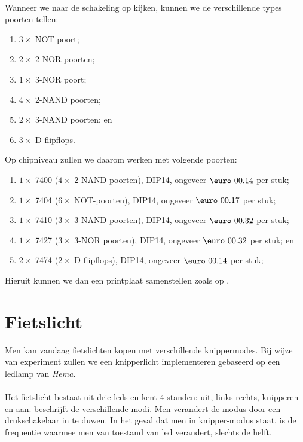 \paragraph{}
Wanneer we naar de schakeling op  kijken, kunnen we de verschillende types poorten tellen:
\begin{enumerate}
 \item $3\times$ NOT poort;%
 \item $2\times$ 2-NOR poorten;
 \item $1\times$ 3-NOR poort;
 \item $4\times$ 2-NAND poorten;%
 \item $2\times$ 3-NAND poorten; en%
 \item $3\times$ D-flipflops.%
\end{enumerate}
Op chipniveau zullen we daarom werken met volgende poorten:
\begin{enumerate}
 \item $1\times$ 7400 ($4\times$ 2-NAND poorten), DIP14, ongeveer $\mbox{\euro}\ 00.14$ per stuk;
 \item $1\times$ 7404 ($6\times$ NOT-poorten), DIP14, ongeveer $\mbox{\euro}\ 00.17$ per stuk;
 \item $1\times$ 7410 ($3\times$ 3-NAND poorten), DIP14, ongeveer $\mbox{\euro}\ 00.32$ per stuk;
 \item $1\times$ 7427 ($3\times$ 3-NOR poorten), DIP14, ongeveer $\mbox{\euro}\ 00.32$ per stuk; en
 \item $2\times$ 7474 ($2\times$ D-flipflops), DIP14, ongeveer $\mbox{\euro}\ 00.14$ per stuk;
\end{enumerate}
Hieruit kunnen we dan een printplaat samenstellen zoals op .
\section{Fietslicht}
Men kan vandaag fietslichten kopen met verschillende knippermodes. Bij wijze van experiment zullen we een knipperlicht implementeren gebaseerd op een ledlamp van \emph{Hema}.
\paragraph{}
Het fietslicht bestaat uit drie leds en kent 4 standen: uit, links-rechts, knipperen en aan.  beschrijft de verschillende modi. Men verandert de modus door een drukschakelaar in te duwen. In het geval dat men in knipper-modus staat, is de frequentie waarmee men van toestand van led verandert, slechts de helft.
